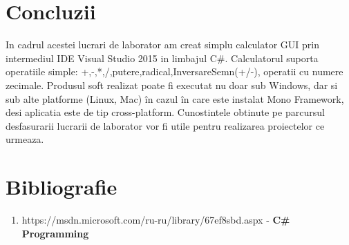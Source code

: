 \documentclass[12pt]{article}
\begin{document}
\section*{Concluzii}
In cadrul acestei lucrari de laborator am creat simplu calculator GUI prin intermediul IDE Visual Studio 2015 in limbajul C\#. Calculatorul suporta operatiile simple: +,-,*,/,putere,radical,InversareSemn(+/-), operatii cu numere zecimale. Produsul soft realizat poate fi executat nu doar sub Windows, dar si sub alte platforme (Linux, Mac) în cazul în care este instalat Mono Framework, desi  aplicatia este de tip cross-platform. Cunostintele obtinute pe parcursul desfasurarii lucrarii de laborator vor fi utile pentru realizarea proiectelor ce urmeaza.
\section*{Bibliografie}
\begin{enumerate}
\item https://msdn.microsoft.com/ru-ru/library/67ef8sbd.aspx - \textbf{C\# Programming}
\end{enumerate}
\end{document}
